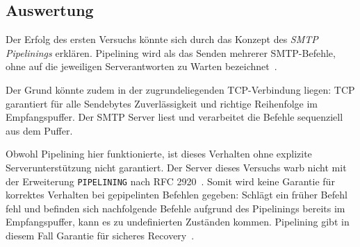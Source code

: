 \subsection*{Auswertung}

Der Erfolg des ersten Versuchs könnte sich durch das Konzept des \textit{SMTP Pipelinings} erklären.
Pipelining wird als das Senden mehrerer SMTP-Befehle, ohne auf die jeweiligen Serverantworten zu Warten bezeichnet~\cite{rfc2920_smtp_pipelining}.

Der Grund könnte zudem in der zugrundeliegenden TCP-Verbindung liegen: TCP garantiert für alle Sendebytes Zuverlässigkeit und richtige Reihenfolge im Empfangspuffer.
Der SMTP Server liest und verarbeitet die Befehle sequenziell aus dem Puffer.

Obwohl Pipelining hier funktionierte, ist dieses Verhalten ohne explizite Serverunterstützung nicht garantiert.
Der Server dieses Versuchs warb nicht mit der Erweiterung \texttt{PIPELINING} nach RFC 2920~\cite{rfc2920_smtp_pipelining}.
Somit wird keine Garantie für korrektes Verhalten bei gepipelinten Befehlen gegeben:
Schlägt ein früher Befehl fehl und befinden sich nachfolgende Befehle aufgrund des Pipelinings bereits im Empfangspuffer, kann es zu undefinierten Zuständen kommen.
Pipelining gibt in diesem Fall Garantie für sicheres Recovery~\cite{rfc2920_smtp_pipelining}.